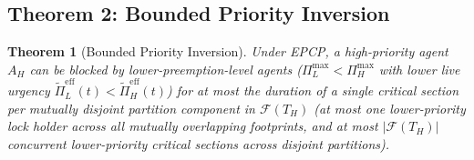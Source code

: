 \documentclass[conference,10pt]{IEEEtran}
\newtheorem{theorem}{Theorem}
\begin{document}
\subsection{Theorem 2: Bounded Priority Inversion}
\begin{theorem}[Bounded Priority Inversion]
Under EPCP, a high-priority agent $A_H$ can be blocked by lower-preemption-level agents ($\Pi_L^{\max} < \Pi_H^{\max}$ with lower live urgency $\tilde{\Pi}_L^{\text{eff}}(t) < \tilde{\Pi}_H^{\text{eff}}(t)$) for at most the duration of a single critical section per mutually disjoint partition component in $\mathcal{F}(T_H)$ (at most one lower-priority lock holder across all mutually overlapping footprints, and at most $|\mathcal{F}(T_H)|$ concurrent lower-priority critical sections across disjoint partitions).
\end{theorem}
\end{document}
